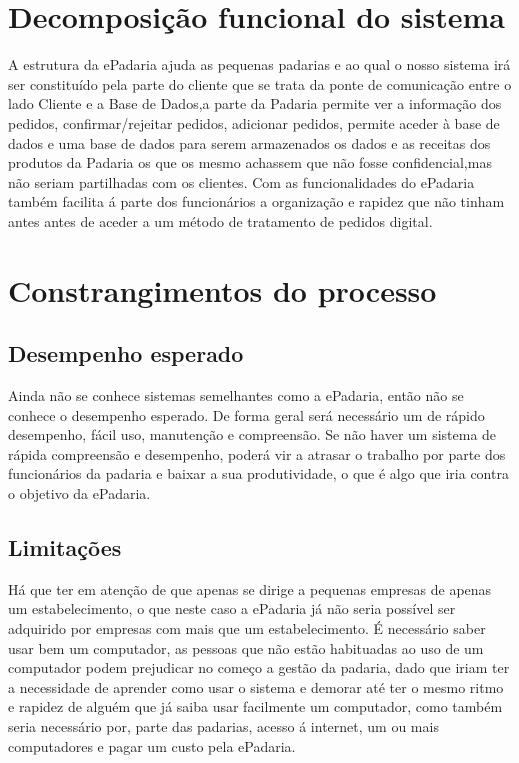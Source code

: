 \section{Decomposição funcional do sistema}


A estrutura da ePadaria ajuda as pequenas padarias e ao qual o nosso sistema irá ser constituído pela parte do cliente que se trata da ponte de comunicação entre o lado Cliente e a Base de Dados,a parte da Padaria permite ver a informação dos pedidos, confirmar/rejeitar pedidos, adicionar pedidos, permite aceder à base de dados e uma base de dados para serem armazenados os dados e as receitas dos produtos da Padaria os que os mesmo achassem que não fosse confidencial,mas não seriam partilhadas com os clientes. Com as funcionalidades do ePadaria também facilita á parte dos funcionários a organização e rapidez que não tinham antes antes de aceder a um método de tratamento de pedidos digital.

\section{Constrangimentos do processo}
\subsection{Desempenho esperado}
Ainda não se conhece sistemas semelhantes como a ePadaria, então não se conhece o desempenho esperado. De forma geral será necessário um de rápido desempenho, fácil uso, manutenção e compreensão. Se não haver um sistema de rápida compreensão e desempenho, poderá vir a atrasar o trabalho por parte dos funcionários da padaria e baixar a sua produtividade, o que é algo que iria contra o objetivo da ePadaria.

\subsection{Limitações} 
Há que ter em atenção de que apenas se dirige a pequenas empresas de apenas um estabelecimento, o que neste caso a ePadaria já não seria possível ser adquirido por empresas com mais que um estabelecimento. É necessário saber usar bem um computador, as pessoas que não estão habituadas ao uso de um computador podem prejudicar no começo a gestão da padaria, dado que iriam ter a necessidade de aprender como usar o sistema e demorar até ter o mesmo ritmo e rapidez de alguém que já saiba usar facilmente um computador, como também seria necessário por, parte das padarias, acesso á internet, um ou mais computadores e pagar um custo pela ePadaria.\\
